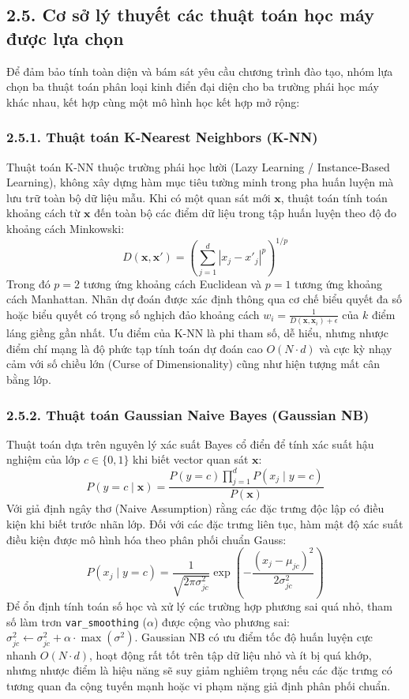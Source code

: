 \documentclass[12pt,a4paper]{article}
\begin{document}
\subsection{2.5. Cơ sở lý thuyết các thuật toán học máy được lựa chọn}
Để đảm bảo tính toàn diện và bám sát yêu cầu chương trình đào tạo, nhóm lựa chọn ba thuật toán phân loại kinh điển đại diện cho ba trường phái học máy khác nhau, kết hợp cùng một mô hình học kết hợp mở rộng:

\subsubsection{2.5.1. Thuật toán K-Nearest Neighbors (K-NN)}
Thuật toán K-NN thuộc trường phái học lười (Lazy Learning / Instance-Based Learning), không xây dựng hàm mục tiêu tường minh trong pha huấn luyện mà lưu trữ toàn bộ dữ liệu mẫu. Khi có một quan sát mới $\mathbf{x}$, thuật toán tính toán khoảng cách từ $\mathbf{x}$ đến toàn bộ các điểm dữ liệu trong tập huấn luyện theo độ đo khoảng cách Minkowski:
\begin{equation}
D(\mathbf{x}, \mathbf{x}') = \left(\sum_{j=1}^d |x_j - x'_j|^p\right)^{1/p}
\end{equation}
Trong đó $p=2$ tương ứng khoảng cách Euclidean và $p=1$ tương ứng khoảng cách Manhattan. Nhãn dự đoán được xác định thông qua cơ chế biểu quyết đa số hoặc biểu quyết có trọng số nghịch đảo khoảng cách $w_i = \frac{1}{D(\mathbf{x}, \mathbf{x}_i) + \epsilon}$ của $k$ điểm láng giềng gần nhất. Ưu điểm của K-NN là phi tham số, dễ hiểu, nhưng nhược điểm chí mạng là độ phức tạp tính toán dự đoán cao $O(N \cdot d)$ và cực kỳ nhạy cảm với số chiều lớn (Curse of Dimensionality) cũng như hiện tượng mất cân bằng lớp.

\subsubsection{2.5.2. Thuật toán Gaussian Naive Bayes (Gaussian NB)}
Thuật toán dựa trên nguyên lý xác suất Bayes cổ điển để tính xác suất hậu nghiệm của lớp $c \in \{0, 1\}$ khi biết vector quan sát $\mathbf{x}$:
\begin{equation}
P(y=c \mid \mathbf{x}) = \frac{P(y=c) \prod_{j=1}^d P(x_j \mid y=c)}{P(\mathbf{x})}
\end{equation}
Với giả định ngây thơ (Naive Assumption) rằng các đặc trưng độc lập có điều kiện khi biết trước nhãn lớp. Đối với các đặc trưng liên tục, hàm mật độ xác suất điều kiện được mô hình hóa theo phân phối chuẩn Gauss:
\begin{equation}
P(x_j \mid y=c) = \frac{1}{\sqrt{2\pi\sigma_{jc}^2}} \exp\left(-\frac{(x_j - \mu_{jc})^2}{2\sigma_{jc}^2}\right)
\end{equation}
Để ổn định tính toán số học và xử lý các trường hợp phương sai quá nhỏ, tham số làm trơn \texttt{var\_smoothing} ($\alpha$) được cộng vào phương sai: $\sigma_{jc}^2 \leftarrow \sigma_{jc}^2 + \alpha \cdot \max(\sigma^2)$. Gaussian NB có ưu điểm tốc độ huấn luyện cực nhanh $O(N \cdot d)$, hoạt động rất tốt trên tập dữ liệu nhỏ và ít bị quá khớp, nhưng nhược điểm là hiệu năng sẽ suy giảm nghiêm trọng nếu các đặc trưng có tương quan đa cộng tuyến mạnh hoặc vi phạm nặng giả định phân phối chuẩn.
\end{document}
